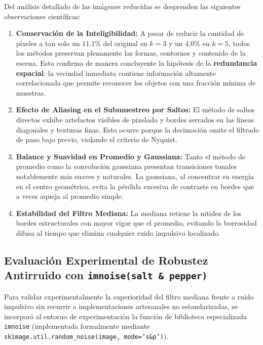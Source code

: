 \documentclass{article}
\begin{document}
Del análisis detallado de las imágenes reducidas se desprenden las siguientes observaciones científicas:
\begin{enumerate}
    \item \textbf{Conservación de la Inteligibilidad:} A pesar de reducir la cantidad de píxeles a tan solo un $11.1\%$ del original en $k=3$ y un $4.0\%$ en $k=5$, todos los métodos preservan plenamente las formas, contornos y contenido de la escena. Esto confirma de manera concluyente la hipótesis de la \textbf{redundancia espacial}: la vecindad inmediata contiene información altamente correlacionada que permite reconocer los objetos con una fracción mínima de muestras.
    \item \textbf{Efecto de Aliasing en el Submuestreo por Saltos:} El método de saltos directos exhibe artefactos visibles de pixelado y bordes serrados en las líneas diagonales y texturas finas. Esto ocurre porque la decimación omite el filtrado de paso bajo previo, violando el criterio de Nyquist.
    \item \textbf{Balance y Suavidad en Promedio y Gaussiana:} Tanto el método de promedio como la convolución gaussiana presentan transiciones tonales notablemente más suaves y naturales. La gaussiana, al concentrar su energía en el centro geométrico, evita la pérdida excesiva de contraste en bordes que a veces aqueja al promedio simple.
    \item \textbf{Estabilidad del Filtro Mediana:} La mediana retiene la nitidez de los bordes estructurales con mayor vigor que el promedio, evitando la borrosidad difusa al tiempo que elimina cualquier ruido impulsivo localizado.
\end{enumerate}

\subsection{Evaluación Experimental de Robustez Antirruido con \texttt{imnoise(salt \& pepper)}}
Para validar experimentalmente la superioridad del filtro mediana frente a ruido impulsivo sin recurrir a implementaciones artesanales no estandarizadas, se incorporó al entorno de experimentación la función de biblioteca especializada \texttt{imnoise} (implementada formalmente mediante \texttt{skimage.util.random\_noise(image, mode='s\&p')}).
\end{document}
